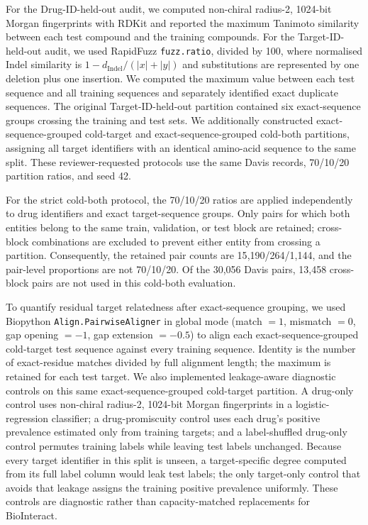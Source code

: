 \documentclass[fleqn,10pt]{wlscirep}
\begin{document}
For the Drug-ID-held-out audit, we computed non-chiral radius-2, 1024-bit Morgan
fingerprints with RDKit and
reported the maximum Tanimoto similarity between each test compound and the
training compounds. For the Target-ID-held-out audit, we used RapidFuzz
\texttt{fuzz.ratio}, divided by 100, where normalised Indel similarity is
$1-d_\mathrm{Indel}/(|x|+|y|)$ and substitutions are represented by one
deletion plus one insertion. We computed the maximum value between each test
sequence and all training sequences and separately identified exact duplicate
sequences. The original Target-ID-held-out partition contained six exact-sequence groups crossing the
training and test sets.  We additionally constructed exact-sequence-grouped cold-target
and exact-sequence-grouped cold-both partitions, assigning all target identifiers with an identical
amino-acid sequence to the same split.  These reviewer-requested protocols use
the same Davis records, 70/10/20 partition ratios, and seed 42.

For the strict cold-both protocol, the 70/10/20 ratios are applied independently
to drug identifiers and exact target-sequence groups. Only pairs for which both
entities belong to the same train, validation, or test block are retained;
cross-block combinations are excluded to prevent either entity from crossing a
partition. Consequently, the retained pair counts are 15{,}190/264/1{,}144,
and the pair-level proportions are not 70/10/20. Of the 30{,}056 Davis pairs,
13{,}458 cross-block pairs are not used in this cold-both evaluation.

To quantify residual target relatedness after exact-sequence grouping, we used
Biopython \texttt{Align.PairwiseAligner} in global mode (match $=1$, mismatch
$=0$, gap opening $=-1$, gap extension $=-0.5$) to align each
exact-sequence-grouped cold-target test sequence against every training sequence.
Identity is the number of exact-residue matches divided by full alignment length;
the maximum is retained for each test target. We also implemented leakage-aware
diagnostic controls on this same exact-sequence-grouped cold-target partition. A
drug-only control uses non-chiral radius-2, 1024-bit
Morgan fingerprints in a logistic-regression classifier; a drug-promiscuity
control uses each drug's positive prevalence estimated only from training
targets; and a label-shuffled drug-only control permutes training labels while
leaving test labels unchanged.  Because every target identifier in this split
is unseen, a target-specific degree computed from its full label column would
leak test labels; the only target-only control that avoids that leakage assigns
the training positive prevalence uniformly.  These controls are diagnostic
rather than capacity-matched replacements for BioInteract.
\endgroup
\end{document}
